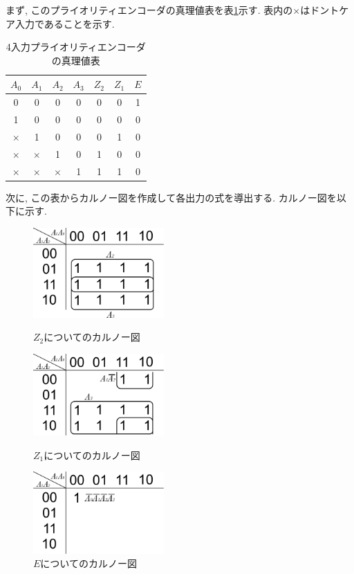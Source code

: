 \documentclass[titlepage]{jsarticle}
\begin{document}
    まず, このプライオリティエンコーダの真理値表を表\ref{tab:priority_encoder}示す.
    表内の$\times$はドントケア入力であることを示す.
    \begin{table}[h]
      \caption{4入力プライオリティエンコーダの真理値表}
      \label{tab:priority_encoder}
      \centering
      \begin{tabular}{cccc||ccc}
        \hline
        $A_0$ & $A_1$ & $A_2$ & $A_3$ & $Z_2$ & $Z_1$ & $E$ \\ \hline \hline
        0 & 0 & 0 & 0 & 0 & 0 & 1 \\
        1 & 0 & 0 & 0 & 0 & 0 & 0 \\
        $\times$ & 1 & 0 & 0 & 0 & 1 & 0 \\
        $\times$ & $\times$ & 1 & 0 & 1 & 0 & 0 \\
        $\times$ & $\times$ & $\times$ & 1 & 1 & 1 & 0 \\ \hline
      \end{tabular}
    \end{table}

    次に, この表からカルノー図を作成して各出力の式を導出する.
    カルノー図を以下に示す.
    \begin{center}
      \begin{figure}[h]
        \begin{minipage}{0.33\hsize}
          \centering
          \includegraphics[width=5cm]{images/Z2Karnaugh.pdf}
          \caption{$Z_2$についてのカルノー図}
        \end{minipage}
        \begin{minipage}{0.33\hsize}
          \centering
          \includegraphics[width=5cm]{images/Z1karnaugh.pdf}
          \caption{$Z_1$についてのカルノー図}
        \end{minipage}
        \begin{minipage}{0.33\hsize}
          \centering
          \includegraphics[width=5cm]{images/Ekarnaugh.pdf}
          \caption{$E$についてのカルノー図}
        \end{minipage}
      \end{figure}
    \end{center}
\end{document}
